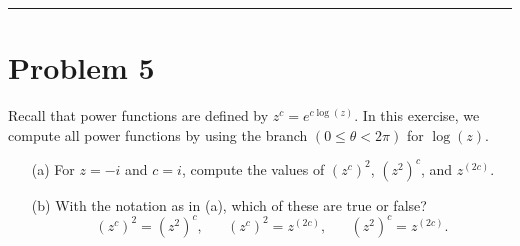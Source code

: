 \documentclass{article}
\begin{document}
\hrule
\newpage
\section*{Problem 5}
Recall that power functions are defined by $z^c = e^{c \log(z)}$. In this exercise, we compute all power functions by using the branch $(0 \leq \theta < 2 \pi)$ for $\log(z)$.
\begin{enumerate}
	\item [(a)] For $z = -i$ and $c = i$, compute the values of $(z^c)^2$, $(z^2)^c$, and $z^{(2c)}$.
	\item [(b)] With the notation as in (a), which of these are true or false?
	      $$ (z^c)^2 = (z^2)^c, \hspace{20pt} (z^c)^2 = z^{(2c)}, \hspace{20pt} (z^2)^c = z^{(2c)}.$$

\end{enumerate}
\end{document}
